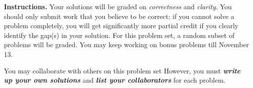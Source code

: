 \ifstudent
{}%
\else
{}%
\fi
\noindent \textbf{Instructions.} Your solutions will be graded on
\emph{correctness} and \emph{clarity}. You should only submit work
that you believe to be correct; if you cannot solve a problem
completely, you will get significantly more partial credit if you
clearly identify the gap(s) in your solution. For this problem set, a
random subset of problems will be graded. You may keep working on
bonus problems till November 13. 

\medskip

\noindent You may collaborate with others on this problem set
However, you must \textbf{\emph{write up your own solutions}} and
\textbf{\emph{list your collaborators}} for each problem.

